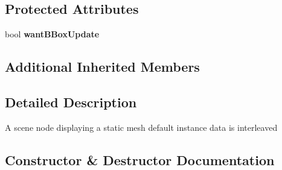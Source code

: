 \subsection*{Protected Attributes}
\begin{DoxyCompactItemize}
\item 
bool {\bfseries want\+B\+Box\+Update}\hypertarget{classirr_1_1scene_1_1IMeshSceneNodeInstanced_ae574130fe1f4e66f64fa429e044f0ba6}{}\label{classirr_1_1scene_1_1IMeshSceneNodeInstanced_ae574130fe1f4e66f64fa429e044f0ba6}

\end{DoxyCompactItemize}
\subsection*{Additional Inherited Members}


\subsection{Detailed Description}
A scene node displaying a static mesh default instance data is interleaved 

\subsection{Constructor \& Destructor Documentation}

